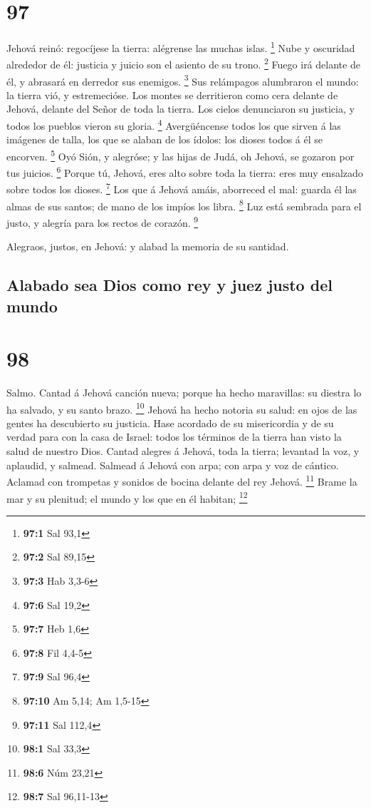 \hypertarget{section-96}{%
\section{97}\label{section-96}}

 Jehová reinó: regocíjese la tierra: alégrense las muchas
islas. \footnote{\textbf{97:1} Sal 93,1}  Nube y oscuridad
alrededor de él: justicia y juicio son el asiento de su trono.
\footnote{\textbf{97:2} Sal 89,15}  Fuego irá delante de él,
y abrasará en derredor sus enemigos. \footnote{\textbf{97:3} Hab 3,3-6}
 Sus relámpagos alumbraron el mundo: la tierra vió, y
estremecióse.  Los montes se derritieron como cera delante
de Jehová, delante del Señor de toda la tierra.  Los cielos
denunciaron su justicia, y todos los pueblos vieron su gloria.
\footnote{\textbf{97:6} Sal 19,2}  Avergüéncense todos los
que sirven á las imágenes de talla, los que se alaban de los ídolos: los
dioses todos á él se encorven. \footnote{\textbf{97:7} Heb 1,6}
 Oyó Sión, y alegróse; y las hijas de Judá, oh Jehová, se
gozaron por tus juicios. \footnote{\textbf{97:8} Fil 4,4-5} 
Porque tú, Jehová, eres alto sobre toda la tierra: eres muy ensalzado
sobre todos los dioses. \footnote{\textbf{97:9} Sal 96,4} 
Los que á Jehová amáis, aborreced el mal: guarda él las almas de sus
santos; de mano de los impíos los libra. \footnote{\textbf{97:10} Am
  5,14; Am 1,5-15}  Luz está sembrada para el justo, y
alegría para los rectos de corazón. \footnote{\textbf{97:11} Sal 112,4}

 Alegraos, justos, en Jehová: y alabad la memoria de su
santidad.

\hypertarget{alabado-sea-dios-como-rey-y-juez-justo-del-mundo}{%
\subsection{Alabado sea Dios como rey y juez justo del
mundo}\label{alabado-sea-dios-como-rey-y-juez-justo-del-mundo}}

\hypertarget{section-97}{%
\section{98}\label{section-97}}

 Salmo. Cantad á Jehová canción nueva; porque ha hecho
maravillas: su diestra lo ha salvado, y su santo brazo. \footnote{\textbf{98:1}
  Sal 33,3}  Jehová ha hecho notoria su salud: en ojos de
las gentes ha descubierto su justicia.  Hase acordado de su
misericordia y de su verdad para con la casa de Israel: todos los
términos de la tierra han visto la salud de nuestro Dios. 
Cantad alegres á Jehová, toda la tierra; levantad la voz, y aplaudid, y
salmead.  Salmead á Jehová con arpa; con arpa y voz de
cántico.  Aclamad con trompetas y sonidos de bocina delante
del rey Jehová. \footnote{\textbf{98:6} Núm 23,21}  Brame la
mar y su plenitud; el mundo y los que en él habitan; \footnote{\textbf{98:7}
  Sal 96,11-13}

